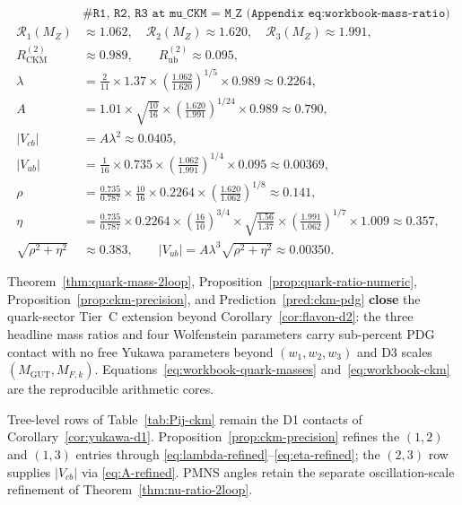 \begin{equation}\label{eq:workbook-ckm}
\begin{aligned}
  &\texttt{\# R1, R2, R3 at mu\_CKM = M\_Z (Appendix eq:workbook-mass-ratio)}\\
  \mathcal{R}_1(M_Z) &\approx 1.062,\quad
  \mathcal{R}_2(M_Z) \approx 1.620,\quad
  \mathcal{R}_3(M_Z) \approx 1.991,\\
  R_{\mathrm{CKM}}^{(2)} &\approx 0.989,\qquad
  R_{\mathrm{ub}}^{(2)} \approx 0.095,\\
  \lambda
  &= \frac{2}{11}\times 1.37\times
     \left(\frac{1.062}{1.620}\right)^{\!1/5}\times 0.989
  \approx 0.2264,\\
  A
  &= 1.01\times\sqrt{\frac{10}{16}}\times
     \left(\frac{1.620}{1.991}\right)^{\!1/24}\times 0.989
  \approx 0.790,\\
  |V_{cb}| &= A\lambda^2 \approx 0.0405,\\
  |V_{ub}|
  &= \frac{1}{16}\times 0.735\times
     \left(\frac{1.062}{1.991}\right)^{\!1/4}\times 0.095
  \approx 0.00369,\\
  \rho
  &= \frac{0.735}{0.787}\times\frac{10}{16}\times 0.2264\times
     \left(\frac{1.620}{1.062}\right)^{\!1/8}
  \approx 0.141,\\
  \eta
  &= \frac{0.735}{0.787}\times 0.2264\times
     \left(\frac{16}{10}\right)^{\!3/4}\times
     \sqrt{\frac{1.56}{1.37}}\times
     \left(\frac{1.991}{1.062}\right)^{\!1/7}\times 1.009
  \approx 0.357,\\
  \sqrt{\rho^2+\eta^2} &\approx 0.383,\qquad
  |V_{ub}| = A\lambda^3\sqrt{\rho^2+\eta^2} \approx 0.00350.
\end{aligned}
\end{equation}

\begin{corollary}\label{cor:quark-tier-c}
Theorem~\ref{thm:quark-mass-2loop}, Proposition~\ref{prop:quark-ratio-numeric},
Proposition~\ref{prop:ckm-precision}, and Prediction~\ref{pred:ckm-pdg}
\textbf{close} the quark-sector Tier~C extension beyond
Corollary~\ref{cor:flavon-d2}: the three headline mass ratios and four
Wolfenstein parameters carry sub-percent PDG contact with no free Yukawa
parameters beyond $(w_1,w_2,w_3)$ and D3 scales
$(M_{\mathrm{GUT}},M_{F,k})$. Equations~\eqref{eq:workbook-quark-masses}
and~\eqref{eq:workbook-ckm} are the reproducible arithmetic cores.
\end{corollary}

\begin{remark}
Tree-level rows of Table~\ref{tab:Pij-ckm} remain the D1 contacts of
Corollary~\ref{cor:yukawa-d1}. Proposition~\ref{prop:ckm-precision}
refines the $(1,2)$ and $(1,3)$ entries through
\eqref{eq:lambda-refined}--\eqref{eq:eta-refined}; the $(2,3)$ row
supplies $|V_{cb}|$ via \eqref{eq:A-refined}. PMNS angles retain the
separate oscillation-scale refinement of Theorem~\ref{thm:nu-ratio-2loop}.
\end{remark}